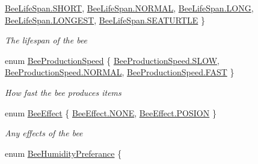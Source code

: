 \begin{DoxyCompactItemize}
\hyperlink{namespace_bee_game_1_1_enums_ae3853807ded2f4d99a0d4a7fb4b2bc46aa35c2b02966b1563e5bf7b81b8b0cf77}{Bee\+Life\+Span.\+S\+H\+O\+RT}, 
\hyperlink{namespace_bee_game_1_1_enums_ae3853807ded2f4d99a0d4a7fb4b2bc46a1e23852820b9154316c7c06e2b7ba051}{Bee\+Life\+Span.\+N\+O\+R\+M\+AL}, 
\newline
\hyperlink{namespace_bee_game_1_1_enums_ae3853807ded2f4d99a0d4a7fb4b2bc46ac1fabfea54ec6011e694f211f3ffebf3}{Bee\+Life\+Span.\+L\+O\+NG}, 
\hyperlink{namespace_bee_game_1_1_enums_ae3853807ded2f4d99a0d4a7fb4b2bc46a9a377a4877bbfa6ed4037fc64476d739}{Bee\+Life\+Span.\+L\+O\+N\+G\+E\+ST}, 
\hyperlink{namespace_bee_game_1_1_enums_ae3853807ded2f4d99a0d4a7fb4b2bc46a264c8ca594c19cceea527c2965380f68}{Bee\+Life\+Span.\+S\+E\+A\+T\+U\+R\+T\+LE}
 \}\begin{DoxyCompactList}\small\item\em The lifespan of the bee \end{DoxyCompactList}
\item 
enum \hyperlink{namespace_bee_game_1_1_enums_afee18200a21cc4b8e1d0cdb669930f14}{Bee\+Production\+Speed} \{ \hyperlink{namespace_bee_game_1_1_enums_afee18200a21cc4b8e1d0cdb669930f14a0e3066cbbd284dce8b76e7c4620d6d75}{Bee\+Production\+Speed.\+S\+L\+OW}, 
\hyperlink{namespace_bee_game_1_1_enums_afee18200a21cc4b8e1d0cdb669930f14a1e23852820b9154316c7c06e2b7ba051}{Bee\+Production\+Speed.\+N\+O\+R\+M\+AL}, 
\hyperlink{namespace_bee_game_1_1_enums_afee18200a21cc4b8e1d0cdb669930f14adca6e617f6fb54033deb311e7e7c93cc}{Bee\+Production\+Speed.\+F\+A\+ST}
 \}\begin{DoxyCompactList}\small\item\em How fast the bee produces items \end{DoxyCompactList}
\item 
enum \hyperlink{namespace_bee_game_1_1_enums_acf7ae32a86385a40fc0c7b55af95c6c3}{Bee\+Effect} \{ \hyperlink{namespace_bee_game_1_1_enums_acf7ae32a86385a40fc0c7b55af95c6c3ab50339a10e1de285ac99d4c3990b8693}{Bee\+Effect.\+N\+O\+NE}, 
\hyperlink{namespace_bee_game_1_1_enums_acf7ae32a86385a40fc0c7b55af95c6c3a70a4c0cd10fc77f4e760429b2633d739}{Bee\+Effect.\+P\+O\+S\+I\+ON}
 \}\begin{DoxyCompactList}\small\item\em Any effects of the bee \end{DoxyCompactList}
\item 
enum \hyperlink{namespace_bee_game_1_1_enums_a66566cbc9da8d1d1e402156b4bd3bf9d}{Bee\+Humidity\+Preferance} \{ \newline

\end{DoxyCompactItemize}
